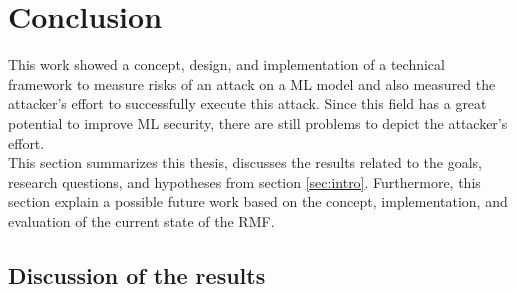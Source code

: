 \section{Conclusion}
\label{sec:conclusion}

This work showed a concept, design, and implementation of a technical framework to measure risks of an attack on a ML model and also measured the attacker's effort to successfully execute this attack. Since this field has a great potential to improve ML security, there are still problems to depict the attacker's effort. \\
This section summarizes this thesis, discusses the results related to the goals, research questions, and hypotheses from section \ref{sec:intro}. Furthermore, this section explain a possible future work based on the concept, implementation, and evaluation of the current state of the RMF.

\subsection{Discussion of the results}

